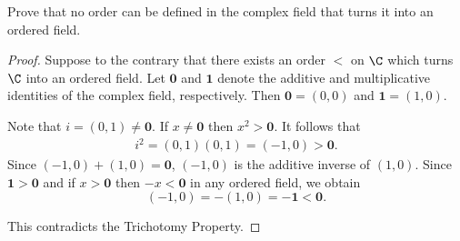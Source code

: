 \begin{exercise}
Prove that no order can be defined in the complex field that turns it into an ordered field.
\end{exercise}
\begin{proof}
Suppose to the contrary that there exists an order $<$ on $\C$ which turns $\C$ into an ordered field.
Let $\mathbf{0}$ and $\mathbf{1}$ denote the additive and multiplicative identities of the complex field, respectively. 
Then $\mathbf{0}=(0,0)$ and $\mathbf{1}=(1,0)$. 

Note that $i = (0,1) \neq \mathbf{0}$.
If $x \neq \mathbf{0}$ then $x^2 > \mathbf{0}$. 
It follows that
\begin{align*}
    i^2=(0,1)(0,1)=(-1,0)>\mathbf{0}.
\end{align*}
Since $(-1,0)+(1,0)=\mathbf{0}$, $(-1,0)$ is the additive inverse of $(1,0)$. 
Since $\mathbf{1}>\mathbf{0}$ and if $x>\mathbf{0}$ then $-x<\mathbf{0}$ in any ordered field, we obtain
\[
(-1,0)=-(1,0)=-\mathbf{1}<\mathbf{0}.
\]

This contradicts the Trichotomy Property. 
\end{proof}